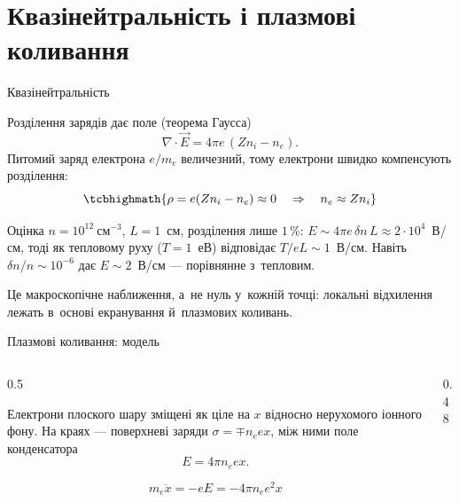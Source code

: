 \documentclass[]{beamer}
\newcommand{\cm}{\mathrm{см}}
\begin{document}
\section{Квазінейтральність і плазмові коливання}

\begin{frame}{Квазінейтральність}
	\begin{block}{}\justifying\small
		Розділення зарядів дає поле (теорема Гаусса)
		\begin{equation*}
			\nabla\cdot\vec E=4\pi e\,(Zn_i-n_e).
		\end{equation*}
		Питомий заряд електрона $e/m_e$ величезний, тому електрони швидко компенсують розділення:
		\begin{equation*}
			\tcbhighmath{\rho=e(Zn_i-n_e)\approx0\quad\Rightarrow\quad n_e\approx Zn_i}
		\end{equation*}
	\end{block}
	\begin{exampleblock}{Оцінка}\justifying\scriptsize
		$n=10^{12}~\cm^{-3}$, $L=1$~см, розділення лише $1\,\%$: $E\sim4\pi e\,\delta n\,L\approx2\cdot10^4$~В/см,
		тоді як тепловому руху ($T=1$~еВ) відповідає $T/eL\sim1$~В/см. Навіть $\delta n/n\sim10^{-6}$ дає
		$E\sim2$~В/см --- порівнянне з~тепловим.
	\end{exampleblock}
	\begin{alertblock}{}\justifying\scriptsize
		Це макроскопічне наближення, а~не нуль у~кожній точці: локальні відхилення лежать в~основі
		екранування й~плазмових коливань.
	\end{alertblock}
\end{frame}

\begin{frame}{Плазмові коливання: модель}
	\begin{columns}[T]
		\begin{column}{0.5\linewidth}
			\begin{block}{}\justifying\scriptsize
				Електрони плоского шару зміщені як ціле на $x$ відносно нерухомого іонного фону. На краях ---
				поверхневі заряди $\sigma=\mp n_eex$, між ними поле конденсатора
				\begin{equation*}
					E=4\pi n_eex.
				\end{equation*}
			\end{block}
			\begin{block}{}\scriptsize
				\begin{equation*}
					m_e\ddot x=-eE=-4\pi n_ee^2x
				\end{equation*}
			\end{block}
		\end{column}
		\begin{column}{0.48\linewidth}
			\centering
			\resizebox{!}{3.2cm}{}\\[0.3em]
			\resizebox{!}{2.6cm}{}
		\end{column}
	\end{columns}
\end{frame}
\end{document}
